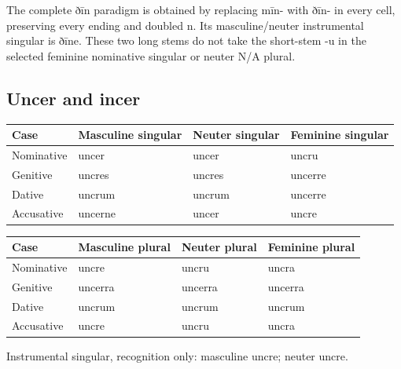 The complete ðīn paradigm is obtained by replacing mīn- with ðīn- in every cell, preserving every ending and doubled n. Its masculine/\allowbreak{}neuter instrumental singular is ðīne. These two long stems do not take the short-stem -u in the selected feminine nominative singular or neuter N/\allowbreak{}A plural.

\subsection*{Uncer and incer}

\par\begingroup
\fontsize{10.5}{13.2}\selectfont
\setlength{\LTleft}{0pt}\setlength{\LTright}{\fill}
\noindent
\begin{tabular}{@{}>{\raggedright\arraybackslash}p{22.0mm}>{\raggedright\arraybackslash}p{31.188mm}>{\raggedright\arraybackslash}p{31.188mm}>{\raggedright\arraybackslash}p{31.188mm}@{}}
\toprule
\textbf{Case} & \textbf{Masculine singular} & \textbf{Neuter singular} & \textbf{Feminine singular} \\
\midrule
Nominative & uncer & uncer & uncru \\
Genitive & uncres & uncres & uncerre \\
Dative & uncrum & uncrum & uncerre \\
Accusative & uncerne & uncer & uncre \\
\bottomrule
\end{tabular}
\par\endgroup
\par\addvspace{5pt}
\par\begingroup
\fontsize{10.5}{13.2}\selectfont
\setlength{\LTleft}{0pt}\setlength{\LTright}{\fill}
\noindent
\begin{tabular}{@{}>{\raggedright\arraybackslash}p{22.0mm}>{\raggedright\arraybackslash}p{31.188mm}>{\raggedright\arraybackslash}p{31.188mm}>{\raggedright\arraybackslash}p{31.188mm}@{}}
\toprule
\textbf{Case} & \textbf{Masculine plural} & \textbf{Neuter plural} & \textbf{Feminine plural} \\
\midrule
Nominative & uncre & uncru & uncra \\
Genitive & uncerra & uncerra & uncerra \\
Dative & uncrum & uncrum & uncrum \\
Accusative & uncre & uncru & uncra \\
\bottomrule
\end{tabular}
\par\endgroup
Instrumental singular, recognition only: masculine uncre; neuter uncre.

